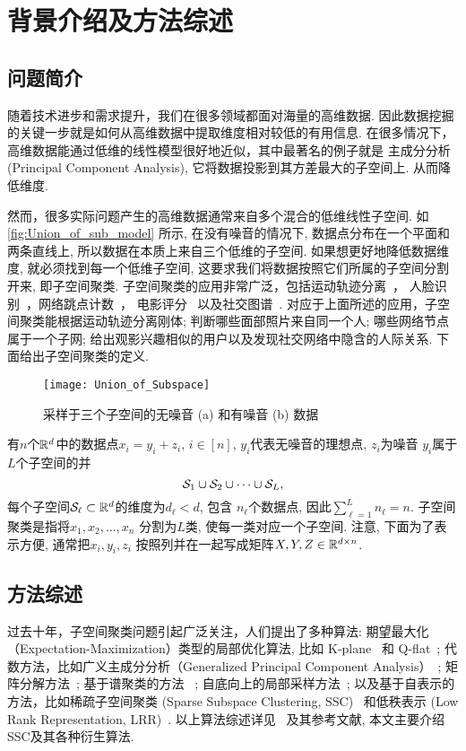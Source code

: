 \chapter{背景介绍及方法综述}\label{chp:intro}
\section{问题简介}
随着技术进步和需求提升，我们在很多领域都面对海量的高维数据. 
因此数据挖掘的关键一步就是如何从高维数据中提取维度相对较低的有用信息.
在很多情况下，高维数据能通过低维的线性模型很好地近似，其中最著名的例子就是
主成分分析(Principal Component Analysis), 它将数据投影到其方差最大的子空间上.
从而降低维度.

然而，很多实际问题产生的高维数据通常来自多个混合的低维线性子空间.
如\autoref{fig:Union_of_sub_model} 所示, 在没有噪音的情况下,
数据点分布在一个平面和两条直线上, 所以数据在本质上来自三个低维的子空间.
如果想更好地降低数据维度, 就必须找到每一个低维子空间,
这要求我们将数据按照它们所属的子空间分割开来, 即子空间聚类.
子空间聚类的应用非常广泛，包括运动轨迹分离~\cite{costeira1998multibody}，
人脸识别~\cite{basri2003lambertian}，网络跳点计数~\cite{eriksson2011high}，
电影评分~\cite{zhang2012guess} 以及社交图谱~\cite{chen2014clustering}.
对应于上面所述的应用，子空间聚类能根据运动轨迹分离刚体;
判断哪些面部照片来自同一个人; 哪些网络节点属于一个子网;
给出观影兴趣相似的用户以及发现社交网络中隐含的人际关系.
下面给出子空间聚类的定义.
\begin{figure}[tb]
  \centering
  \texttt{[image: Union\_of\_Subspace]}
  \caption{采样于三个子空间的无噪音 (a) 和有噪音 (b) 数据}\label{fig:Union_of_sub_model}
\end{figure}
\begin{definition}\label{def:sc}
  有\(n\)个\(\mathbb{R}^d\)中的数据点\(x_i = y_i+z_i, \, i \in [n]\),
  \(y_i\)代表无噪音的理想点, \(z_i\)为噪音
  \(y_i\)属于\(L\)个子空间的并
  \[\mathcal{S}_1 \cup \mathcal{S}_2 \cup\cdots\cup \mathcal{S}_L,\]
  每个子空间\(\mathcal{S}_\ell \subset \mathbb{R}^d\)的维度为\(d_{\ell} < d\),
  包含 \(n_{\ell}\)个数据点, 因此\(\sum_{\ell=1}^L n_\ell=n\). 
  子空间聚类是指将\(x_1, x_2, \ldots, x_n\) 分割为\(L\)类,
  使每一类对应一个子空间. 
  注意, 下面为了表示方便, 通常把\(x_i, y_i, z_i\)
  按照列并在一起写成矩阵\(X, Y, Z\in \mathbb{R}^{d\times n}\).
\end{definition}
\section{方法综述}
过去十年，子空间聚类问题引起广泛关注，人们提出了多种算法:
期望最大化（Expectation-Maximization）类型的局部优化算法,
比如 K-plane~\cite{bradley2000k} 和 Q-flat~\cite{tseng2000nearest};
代数方法，比如广义主成分分析（Generalized Principal Component Analysis）~\cite{vidal2005generalized};
矩阵分解方法~\cite{costeira1995multi,costeira1998multibody}; 基于谱聚类的方法
~\cite{chen2009spectral,lauer2009spectral}; 自底向上的局部采样方法~\cite{rao2008motion,yan2006general};
以及基于自表示的方法，比如稀疏子空间聚类 (Sparse Subspace Clustering, SSC)~\cite{elhamifar2009sparse,elhamifar2013sparse}
和低秩表示 (Low Rank Representation, LRR)~\cite{liu2010robust,liu2013robust}.
以上算法综述详见~\cite{vidal2010tutorial} 及其参考文献,
本文主要介绍SSC及其各种衍生算法.

